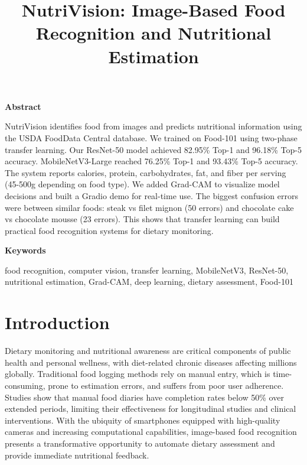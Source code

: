 \documentclass[conference]{IEEEtran}
\begin{document}
\title{NutriVision: Image-Based Food Recognition and Nutritional Estimation}
\author{
}
\maketitle

\noindent\textbf{Abstract}

NutriVision identifies food from images and predicts nutritional information using the USDA FoodData Central database. We trained on Food-101 using two-phase transfer learning. Our ResNet-50 model achieved 82.95\% Top-1 and 96.18\% Top-5 accuracy. MobileNetV3-Large reached 76.25\% Top-1 and 93.43\% Top-5 accuracy. The system reports calories, protein, carbohydrates, fat, and fiber per serving (45-500g depending on food type). We added Grad-CAM to visualize model decisions and built a Gradio demo for real-time use. The biggest confusion errors were between similar foods: steak vs filet mignon (50 errors) and chocolate cake vs chocolate mousse (23 errors). This shows that transfer learning can build practical food recognition systems for dietary monitoring.

\noindent\textbf{Keywords}

food recognition, computer vision, transfer learning, MobileNetV3, ResNet-50, nutritional estimation, Grad-CAM, deep learning, dietary assessment, Food-101

\section{Introduction}
Dietary monitoring and nutritional awareness are critical components of public health and personal wellness, with diet-related chronic diseases affecting millions globally. Traditional food logging methods rely on manual entry, which is time-consuming, prone to estimation errors, and suffers from poor user adherence. Studies show that manual food diaries have completion rates below 50\% over extended periods, limiting their effectiveness for longitudinal studies and clinical interventions. With the ubiquity of smartphones equipped with high-quality cameras and increasing computational capabilities, image-based food recognition presents a transformative opportunity to automate dietary assessment and provide immediate nutritional feedback.
\end{document}
